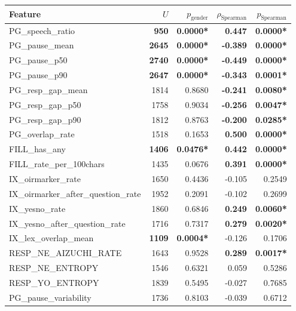 {\small
\begin{tabular}{lrrrr}
\toprule
Feature & $U$ & $p_{\text{gender}}$ & $\rho_{\text{Spearman}}$ & $p_{\text{Spearman}}$ \\
\midrule
PG\_speech\_ratio & \textbf{950} & \textbf{0.0000*} & \textbf{0.447} & \textbf{0.0000*} \\
PG\_pause\_mean & \textbf{2645} & \textbf{0.0000*} & \textbf{-0.389} & \textbf{0.0000*} \\
PG\_pause\_p50 & \textbf{2740} & \textbf{0.0000*} & \textbf{-0.449} & \textbf{0.0000*} \\
PG\_pause\_p90 & \textbf{2647} & \textbf{0.0000*} & \textbf{-0.343} & \textbf{0.0001*} \\
PG\_resp\_gap\_mean & 1814 & 0.8680 & \textbf{-0.241} & \textbf{0.0080*} \\
PG\_resp\_gap\_p50 & 1758 & 0.9034 & \textbf{-0.256} & \textbf{0.0047*} \\
PG\_resp\_gap\_p90 & 1812 & 0.8763 & \textbf{-0.200} & \textbf{0.0285*} \\
PG\_overlap\_rate & 1518 & 0.1653 & \textbf{0.500} & \textbf{0.0000*} \\
FILL\_has\_any & \textbf{1406} & \textbf{0.0476*} & \textbf{0.442} & \textbf{0.0000*} \\
FILL\_rate\_per\_100chars & 1435 & 0.0676 & \textbf{0.391} & \textbf{0.0000*} \\
IX\_oirmarker\_rate & 1650 & 0.4436 & -0.105 & 0.2549 \\
IX\_oirmarker\_after\_question\_rate & 1952 & 0.2091 & -0.102 & 0.2699 \\
IX\_yesno\_rate & 1860 & 0.6846 & \textbf{0.249} & \textbf{0.0060*} \\
IX\_yesno\_after\_question\_rate & 1716 & 0.7317 & \textbf{0.279} & \textbf{0.0020*} \\
IX\_lex\_overlap\_mean & \textbf{1109} & \textbf{0.0004*} & -0.126 & 0.1706 \\
RESP\_NE\_AIZUCHI\_RATE & 1643 & 0.9528 & \textbf{0.289} & \textbf{0.0017*} \\
RESP\_NE\_ENTROPY & 1546 & 0.6321 & 0.059 & 0.5286 \\
RESP\_YO\_ENTROPY & 1839 & 0.5495 & -0.027 & 0.7685 \\
PG\_pause\_variability & 1736 & 0.8103 & -0.039 & 0.6712 \\
\bottomrule
\end{tabular}
}
